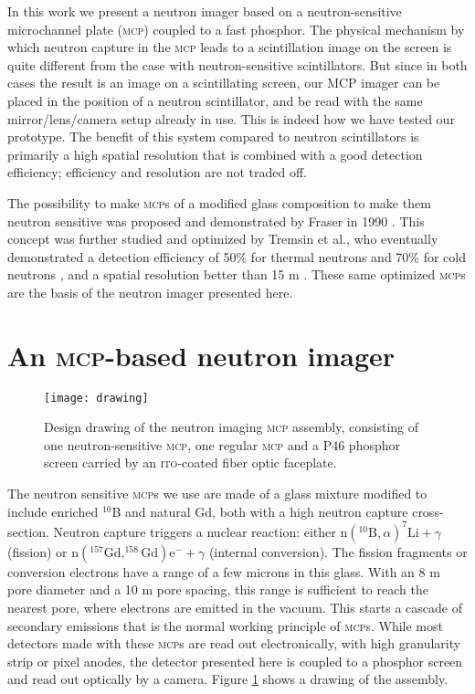 \documentclass[a4paper,11pt]{article}
\begin{document}
In this work we present a neutron imager based on a neutron-sensitive microchannel plate (\textsc{mcp}) coupled to a fast phosphor.
The physical mechanism by which neutron capture in the \textsc{mcp} leads to a scintillation image on the screen is quite different from the case with neutron-sensitive scintillators.
But since in both cases the result is an image on a scintillating screen, our MCP imager can be placed in the position of a neutron scintillator, and be read with the same mirror/lens/camera setup already in use.
This is indeed how we have tested our prototype.
The benefit of this system compared to neutron scintillators is primarily a high spatial resolution that is combined with a good detection efficiency; efficiency and resolution are not traded off.

The possibility to make \textsc{mcp}s of a modified glass composition to make them neutron sensitive was proposed and demonstrated by Fraser in 1990 \cite{Fraser}.
This concept was further studied and optimized by Tremsin et al., who eventually demonstrated a detection efficiency of 50\% for thermal neutrons and 70\% for cold neutrons \cite{Tremsin_efficiency}, and a spatial resolution better than 15 \textmu m \cite{Tremsin_resolution}.
These same optimized \textsc{mcp}s are the basis of the neutron imager presented here.

\section{An \textsc{mcp}-based neutron imager}
 \begin{figure}[tb]
	\centering\texttt{[image: drawing]}
	\caption{Design drawing of the neutron imaging \textsc{mcp} assembly, consisting of one neutron-sensitive \textsc{mcp}, one regular \textsc{mcp} and a P46 phosphor screen carried by an \textsc{ito}-coated fiber optic faceplate.\label{drawing}}
\end{figure}
The neutron sensitive \textsc{mcp}s we use are made of a glass mixture modified to include enriched $^{10}$B and natural Gd, both with a high neutron capture cross-section.
Neutron capture triggers a nuclear reaction: either $\textrm{n}(^{10}\textrm{B}, \alpha)^7\textrm{Li}+\gamma$ (fission) or $\textrm{n}(^{157}\textrm{Gd},^{158}\textrm{Gd})\textrm{e}^-+\gamma$ (internal conversion).
The fission fragments or conversion electrons have a range of a few microns in this glass.
With an 8 \textmu m pore diameter and a 10 \textmu m pore spacing, this range is sufficient to reach the nearest pore, where electrons are emitted in the vacuum.
This starts a cascade of secondary emissions that is the normal working principle of \textsc{mcp}s.
While most detectors made with these \textsc{mcp}s are read out electronically, with high granularity strip or pixel anodes, the detector presented here is coupled to a phosphor screen and read out optically by a camera.
Figure \ref{drawing} shows a drawing of the assembly.
\end{document}
